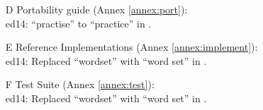 \begin{itemize}
	\item[D] Portability guide (Annex \ref{annex:port}):			%
~ \\
		\textsf{ed14}: ``practise'' to ``practice'' in .

	\item[E] Reference Implementations (Annex \ref{annex:implement}):	%
		~\\ \textsf{ed14}: Replaced ``wordset'' with ``word set'' in
			.

	\item[F] Test Suite (Annex \ref{annex:test}):					%
		~\\ \textsf{ed14}: Replaced ``wordset'' with ``word set'' in
			.
	\end{itemize}



\endinput

